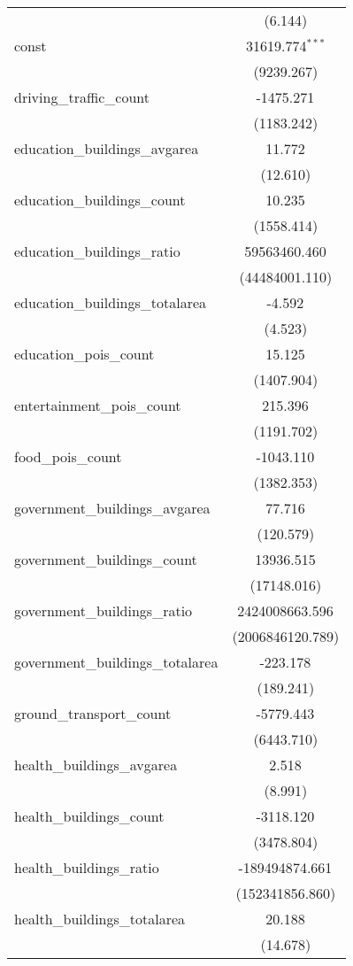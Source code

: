 \begin{table}[!htbp]
\begin{tabular}{@{\extracolsep{5pt}}lc}
  & (6.144) \\
 const & 31619.774$^{***}$ \\
  & (9239.267) \\
 driving_traffic_count & -1475.271$^{}$ \\
  & (1183.242) \\
 education_buildings_avgarea & 11.772$^{}$ \\
  & (12.610) \\
 education_buildings_count & 10.235$^{}$ \\
  & (1558.414) \\
 education_buildings_ratio & 59563460.460$^{}$ \\
  & (44484001.110) \\
 education_buildings_totalarea & -4.592$^{}$ \\
  & (4.523) \\
 education_pois_count & 15.125$^{}$ \\
  & (1407.904) \\
 entertainment_pois_count & 215.396$^{}$ \\
  & (1191.702) \\
 food_pois_count & -1043.110$^{}$ \\
  & (1382.353) \\
 government_buildings_avgarea & 77.716$^{}$ \\
  & (120.579) \\
 government_buildings_count & 13936.515$^{}$ \\
  & (17148.016) \\
 government_buildings_ratio & 2424008663.596$^{}$ \\
  & (2006846120.789) \\
 government_buildings_totalarea & -223.178$^{}$ \\
  & (189.241) \\
 ground_transport_count & -5779.443$^{}$ \\
  & (6443.710) \\
 health_buildings_avgarea & 2.518$^{}$ \\
  & (8.991) \\
 health_buildings_count & -3118.120$^{}$ \\
  & (3478.804) \\
 health_buildings_ratio & -189494874.661$^{}$ \\
  & (152341856.860) \\
 health_buildings_totalarea & 20.188$^{}$ \\
  & (14.678) \\

\end{tabular}
\end{table}

